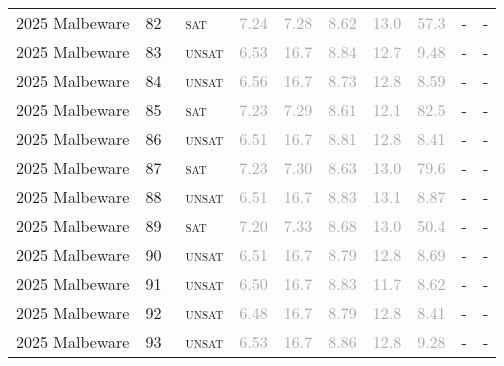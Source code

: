 \begin{center}
{\begin{longtable}{@{}llllllllll@{}}
2025 Malbeware & 82 & ~\textsc{sat} & \textcolor{darkgray}{7.24} & \textcolor{darkgray}{7.28} & \textcolor{darkgray}{8.62} & \textcolor{darkgray}{13.0} & \textcolor{darkgray}{57.3} & - & - \\
2025 Malbeware & 83 & ~\textsc{unsat} & \textcolor{darkgray}{6.53} & \textcolor{darkgray}{16.7} & \textcolor{darkgray}{8.84} & \textcolor{darkgray}{12.7} & \textcolor{darkgray}{9.48} & - & - \\
2025 Malbeware & 84 & ~\textsc{unsat} & \textcolor{darkgray}{6.56} & \textcolor{darkgray}{16.7} & \textcolor{darkgray}{8.73} & \textcolor{darkgray}{12.8} & \textcolor{darkgray}{8.59} & - & - \\
2025 Malbeware & 85 & ~\textsc{sat} & \textcolor{darkgray}{7.23} & \textcolor{darkgray}{7.29} & \textcolor{darkgray}{8.61} & \textcolor{darkgray}{12.1} & \textcolor{darkgray}{82.5} & - & - \\
2025 Malbeware & 86 & ~\textsc{unsat} & \textcolor{darkgray}{6.51} & \textcolor{darkgray}{16.7} & \textcolor{darkgray}{8.81} & \textcolor{darkgray}{12.8} & \textcolor{darkgray}{8.41} & - & - \\
2025 Malbeware & 87 & ~\textsc{sat} & \textcolor{darkgray}{7.23} & \textcolor{darkgray}{7.30} & \textcolor{darkgray}{8.63} & \textcolor{darkgray}{13.0} & \textcolor{darkgray}{79.6} & - & - \\
2025 Malbeware & 88 & ~\textsc{unsat} & \textcolor{darkgray}{6.51} & \textcolor{darkgray}{16.7} & \textcolor{darkgray}{8.83} & \textcolor{darkgray}{13.1} & \textcolor{darkgray}{8.87} & - & - \\
2025 Malbeware & 89 & ~\textsc{sat} & \textcolor{darkgray}{7.20} & \textcolor{darkgray}{7.33} & \textcolor{darkgray}{8.68} & \textcolor{darkgray}{13.0} & \textcolor{darkgray}{50.4} & - & - \\
2025 Malbeware & 90 & ~\textsc{unsat} & \textcolor{darkgray}{6.51} & \textcolor{darkgray}{16.7} & \textcolor{darkgray}{8.79} & \textcolor{darkgray}{12.8} & \textcolor{darkgray}{8.69} & - & - \\
2025 Malbeware & 91 & ~\textsc{unsat} & \textcolor{darkgray}{6.50} & \textcolor{darkgray}{16.7} & \textcolor{darkgray}{8.83} & \textcolor{darkgray}{11.7} & \textcolor{darkgray}{8.62} & - & - \\
2025 Malbeware & 92 & ~\textsc{unsat} & \textcolor{darkgray}{6.48} & \textcolor{darkgray}{16.7} & \textcolor{darkgray}{8.79} & \textcolor{darkgray}{12.8} & \textcolor{darkgray}{8.41} & - & - \\
2025 Malbeware & 93 & ~\textsc{unsat} & \textcolor{darkgray}{6.53} & \textcolor{darkgray}{16.7} & \textcolor{darkgray}{8.86} & \textcolor{darkgray}{12.8} & \textcolor{darkgray}{9.28} & - & - \\

\end{longtable}}
\end{center}
